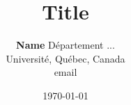 \documentclass{article}
\title{Title}
\date{\today}
\author{
\textbf{Name} \And
\affiliations
Département ... \\
Université, Québec, Canada \\
\emails
email
}
\begin{document}
\newpage
\maketitle


\lipsum



\newpage
\printbibliography
\end{document}
